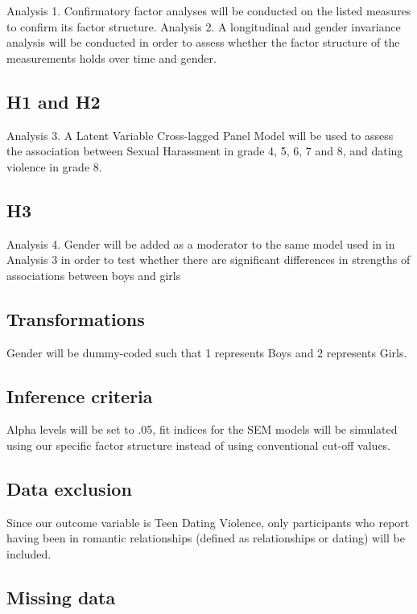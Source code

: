 \documentclass[
]{article}
\begin{document}
Analysis 1. Confirmatory factor analyses will be conducted on the listed
measures to confirm its factor structure. Analysis 2. A longitudinal and
gender invariance analysis will be conducted in order to assess whether
the factor structure of the measurements holds over time and gender.

\subsection{H1 and H2}\label{h1-and-h2}

Analysis 3. A Latent Variable Cross-lagged Panel Model will be used to
assess the association between Sexual Harassment in grade 4, 5, 6, 7 and
8, and dating violence in grade 8.

\subsection{H3}\label{h3}

Analysis 4. Gender will be added as a moderator to the same model used
in in Analysis 3 in order to test whether there are significant
differences in strengths of associations between boys and girls

\subsection{Transformations}\label{transformations}

Gender will be dummy-coded such that 1 represents Boys and 2 represents
Girls.

\subsection{Inference criteria}\label{inference-criteria}

Alpha levels will be set to .05, fit indices for the SEM models will be
simulated using our specific factor structure instead of using
conventional cut-off values.

\subsection{Data exclusion}\label{data-exclusion}

Since our outcome variable is Teen Dating Violence, only participants
who report having been in romantic relationships (defined as
relationships or dating) will be included.

\subsection{Missing data}\label{missing-data}
\end{document}
